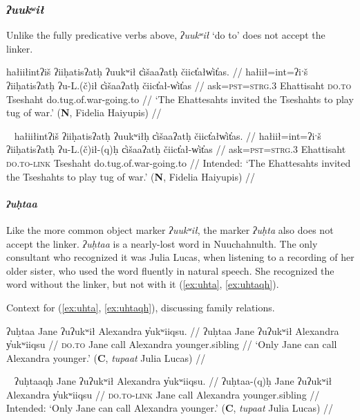 \subsubsection{\textit{ʔuukʷił}} \label{ch:link:uukwil} Unlike the fully predicative verbs above, \textit{ʔuukʷił} `do to' does not accept the linker.

\ex \label{ex:tugofwar1}
\begingl
\glpreamble hałiiłintʔiš ʔiiḥatisʔatḥ ʔuukʷił c̓išaaʔatḥ čiict̓ałw̓it̓as. //
\gla hałiił=int=ʔiˑš ʔiiḥatisʔatḥ ʔu-L.(č)ił c̓išaaʔatḥ čiict̓ał-w̓it̓as //
\glb ask=\textsc{pst}=\textsc{strg.3} Ehattisaht \textsc{do.to} Tseshaht do.tug.of.war-going.to //
\glft `The Ehattesahts invited the Tseshahts to play tug of war.' (\textbf{N}, Fidelia Haiyupis) //
\endgl
\xe

\ex~ \label{ex:tugofwar2}
\begingl
\glpreamble *hałiiłintʔiš ʔiiḥatisʔatḥ ʔuukʷiłḥ c̓išaaʔatḥ čiict̓ałw̓it̓as. //
\gla hałiił=int=ʔiˑš ʔiiḥatisʔatḥ ʔu-L.(č)ił-(q)ḥ c̓išaaʔatḥ čiict̓ał-w̓it̓as //
\glb ask=\textsc{pst}=\textsc{strg.3} Ehattisaht \textsc{do.to}-\textsc{link} Tseshaht do.tug.of.war-going.to //
\glft Intended: `The Ehattesahts invited the Tseshahts to play tug of war.' (\textbf{N}, Fidelia Haiyupis) //
\endgl
\xe

\paragraph{\textit{ʔuḥtaa}} \label{ch:link:uhta} Like the more common object marker \textit{ʔuukʷił}, the marker \textit{ʔuḥta} also does not accept the linker. \textit{ʔuḥtaa} is a nearly-lost word in Nuuchahnulth. The only consultant who recognized it was Julia Lucas, when listening to a recording of her older sister, who used the word fluently in natural speech. She recognized the word without the linker, but not with it (\ref{ex:uhta}, \ref{ex:uhtaqh}).

\vspace{5pt}

\noindent Context for (\ref{ex:uhta}, \ref{ex:uhtaqh}), discussing family relations.

\ex \label{ex:uhta}
\begingl
\glpreamble ʔuḥtaa Jane ʔuʔukʷił Alexandra y̓ukʷiiqsu. //
\gla ʔuḥtaa Jane ʔuʔukʷił Alexandra y̓ukʷiiqsu //
\glb \textsc{do.to} Jane call Alexandra younger.sibling //
\glft `Only Jane can call Alexandra younger.' (\textbf{C}, \textit{tupaat} Julia Lucas) //
\endgl
\xe

\ex~ \label{ex:uhtaqh}
\begingl
\glpreamble *ʔuḥtaaqḥ Jane ʔuʔukʷił Alexandra y̓ukʷiiqsu. //
\gla ʔuḥtaa-(q)ḥ Jane ʔuʔukʷił Alexandra y̓ukʷiiqsu //
\glb \textsc{do.to}-\textsc{link} Jane call Alexandra younger.sibling //
\glft Intended: `Only Jane can call Alexandra younger.' (\textbf{C}, \textit{tupaat} Julia Lucas) //
\endgl
\xe

